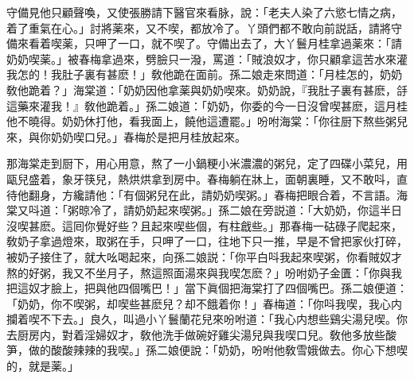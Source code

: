 守備見他只顧聲喚，又使張勝請下醫官來看脉，說：「老夫人染了六慾七情之病，着了重氣在心。」討將薬來，又不喫，都放冷了。丫頭們都不敢向前説話，請將守備來看着喫薬，只呷了一口，就不喫了。守備出去了，大丫鬟月桂拿過薬來：「請奶奶喫薬。」被春梅拿過來，劈臉只一潑，罵道：「賊浪奴才，你只顧拿這苦水來灌我怎的！我肚子裏有甚麽！」敎他跪在面前。孫二娘走來問道：「月桂怎的，奶奶敎他跪着？」海棠道：「奶奶因他拿薬與奶奶喫來。奶奶說，『我肚子裏有甚麽，㧱這藥來灌我！』敎他跪着。」孫二娘道：「奶奶，你委的今一日沒曾喫甚麽，這月桂他不曉得。奶奶休打他，看我面上，饒他這遭罷。」吩咐海棠：「你往厨下熬些粥兒來，與你奶奶喫口兒。」春梅於是把月桂放起來。

那海棠走到厨下，用心用意，熬了一小鍋粳小米濃濃的粥兒，定了四碟小菜兒，用甌兒盛着，象牙筷兒，熱烘烘拿到房中。春梅躺在牀上，面朝裏睡，又不敢呌，直待他翻身，方纔請他：「有個粥兒在此，請奶奶喫粥。」春梅把眼合着，不言語。海棠又呌道：「粥晾冷了，請奶奶起來喫粥。」孫二娘在旁説道：「大奶奶，你這半日沒喫甚麽。這囘你覺好些？且起來喫些個，有柱戧些。」那春梅一𥑮碌子爬起來，敎奶子拿過燈來，取粥在手，只呷了一口，往地下只一推，早是不曾把家伙打碎，被奶子接住了，就大吆喝起來，向孫二娘説：「你平白呌我起來喫粥，你看賊奴才熬的好粥，我又不坐月子，熬這照面湯來與我喫怎麽？」吩咐奶子金匱：「你與我把這奴才臉上，把與他四個嘴巴！」當下眞個把海棠打了四個嘴巴。孫二娘便道：「奶奶，你不喫粥，却喫些甚麽兒？却不餓着你！」春梅道：「你呌我喫，我心内攔着喫不下去。」良久，叫過小丫鬟蘭花兒來吩咐道：「我心内想些鷄尖湯兒喫。你去厨房内，對着淫婦奴才，敎他洗手做碗好雞尖湯兒與我喫口兒。敎他多放些酸笋，做的酸酸辣辣的我喫。」孫二娘便說：「奶奶，吩咐他敎雪娥做去。你心下想喫的，就是薬。」

